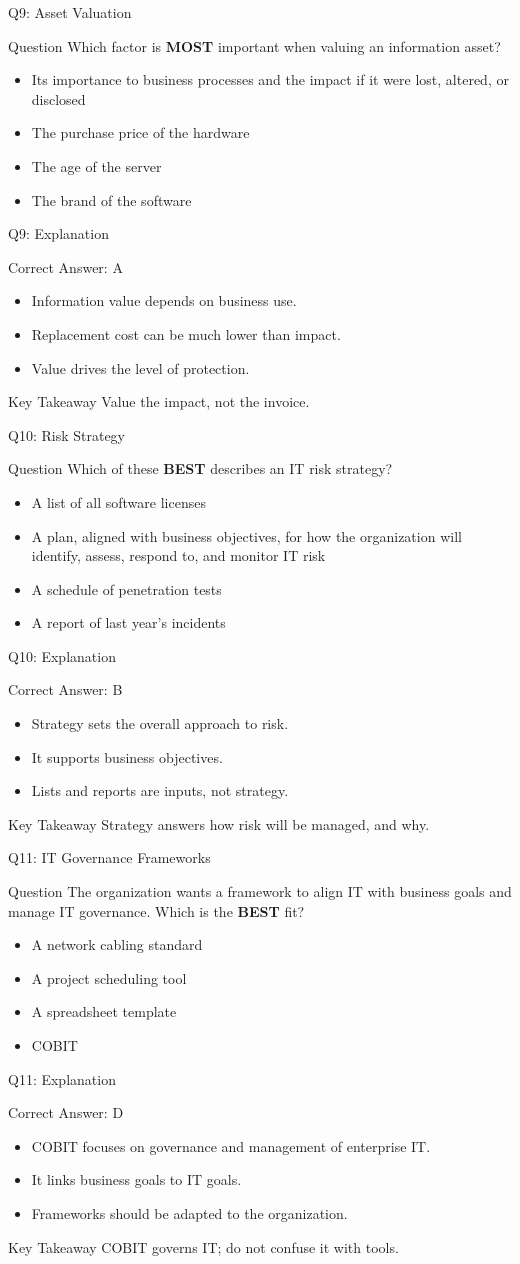 \documentclass[aspectratio=169]{beamer}
\newcommand{\hq}[7]{%
	\begin{frame}{Q#1: #2}
		\begin{block}{Question}
			#3
		\end{block}
		\begin{itemize}
			#4
		\end{itemize}
	\end{frame}
	\begin{frame}{Q#1: Explanation}
		\begin{block}{Correct Answer: #5}
			\begin{itemize}
				#6
			\end{itemize}
		\end{block}
		\begin{alertblock}{Key Takeaway}
			#7
		\end{alertblock}
	\end{frame}
}
\begin{document}
	\hq{9}{Asset Valuation}
	{Which factor is \textbf{MOST} important when valuing an information asset?}
	{\item[\textbf{(A)}] Its importance to business processes and the impact if it were lost, altered, or disclosed
		\item[\textbf{(B)}] The purchase price of the hardware
		\item[\textbf{(C)}] The age of the server
		\item[\textbf{(D)}] The brand of the software}
	{A}
	{\item Information value depends on business use.
		\item Replacement cost can be much lower than impact.
		\item Value drives the level of protection.}
	{Value the impact, not the invoice.}
	
	\hq{10}{Risk Strategy}
	{Which of these \textbf{BEST} describes an IT risk strategy?}
	{\item[\textbf{(A)}] A list of all software licenses
		\item[\textbf{(B)}] A plan, aligned with business objectives, for how the organization will identify, assess, respond to, and monitor IT risk
		\item[\textbf{(C)}] A schedule of penetration tests
		\item[\textbf{(D)}] A report of last year's incidents}
	{B}
	{\item Strategy sets the overall approach to risk.
		\item It supports business objectives.
		\item Lists and reports are inputs, not strategy.}
	{Strategy answers how risk will be managed, and why.}
	
	\hq{11}{IT Governance Frameworks}
	{The organization wants a framework to align IT with business goals and manage IT governance. Which is the \textbf{BEST} fit?}
	{\item[\textbf{(A)}] A network cabling standard
		\item[\textbf{(B)}] A project scheduling tool
		\item[\textbf{(C)}] A spreadsheet template
		\item[\textbf{(D)}] COBIT}
	{D}
	{\item COBIT focuses on governance and management of enterprise IT.
		\item It links business goals to IT goals.
		\item Frameworks should be adapted to the organization.}
	{COBIT governs IT; do not confuse it with tools.}
	
\end{document}
